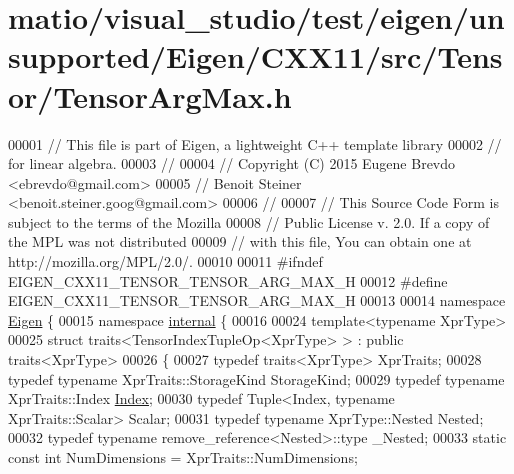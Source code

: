\hypertarget{matio_2visual__studio_2test_2eigen_2unsupported_2_eigen_2_c_x_x11_2src_2_tensor_2_tensor_arg_max_8h_source}{}\section{matio/visual\+\_\+studio/test/eigen/unsupported/\+Eigen/\+C\+X\+X11/src/\+Tensor/\+Tensor\+Arg\+Max.h}
\label{matio_2visual__studio_2test_2eigen_2unsupported_2_eigen_2_c_x_x11_2src_2_tensor_2_tensor_arg_max_8h_source}

\begin{DoxyCode}
00001 \textcolor{comment}{// This file is part of Eigen, a lightweight C++ template library}
00002 \textcolor{comment}{// for linear algebra.}
00003 \textcolor{comment}{//}
00004 \textcolor{comment}{// Copyright (C) 2015 Eugene Brevdo <ebrevdo@gmail.com>}
00005 \textcolor{comment}{//                    Benoit Steiner <benoit.steiner.goog@gmail.com>}
00006 \textcolor{comment}{//}
00007 \textcolor{comment}{// This Source Code Form is subject to the terms of the Mozilla}
00008 \textcolor{comment}{// Public License v. 2.0. If a copy of the MPL was not distributed}
00009 \textcolor{comment}{// with this file, You can obtain one at http://mozilla.org/MPL/2.0/.}
00010 
00011 \textcolor{preprocessor}{#ifndef EIGEN\_CXX11\_TENSOR\_TENSOR\_ARG\_MAX\_H}
00012 \textcolor{preprocessor}{#define EIGEN\_CXX11\_TENSOR\_TENSOR\_ARG\_MAX\_H}
00013 
00014 \textcolor{keyword}{namespace }\hyperlink{namespace_eigen}{Eigen} \{
00015 \textcolor{keyword}{namespace }\hyperlink{namespaceinternal}{internal} \{
00016 
00024 \textcolor{keyword}{template}<\textcolor{keyword}{typename} XprType>
00025 \textcolor{keyword}{struct }traits<TensorIndexTupleOp<XprType> > : \textcolor{keyword}{public} traits<XprType>
00026 \{
00027   \textcolor{keyword}{typedef} traits<XprType> XprTraits;
00028   \textcolor{keyword}{typedef} \textcolor{keyword}{typename} XprTraits::StorageKind StorageKind;
00029   \textcolor{keyword}{typedef} \textcolor{keyword}{typename} XprTraits::Index \hyperlink{namespace_eigen_a62e77e0933482dafde8fe197d9a2cfde}{Index};
00030   \textcolor{keyword}{typedef} Tuple<Index, typename XprTraits::Scalar> Scalar;
00031   \textcolor{keyword}{typedef} \textcolor{keyword}{typename} XprType::Nested Nested;
00032   \textcolor{keyword}{typedef} \textcolor{keyword}{typename} remove\_reference<Nested>::type \_Nested;
00033   \textcolor{keyword}{static} \textcolor{keyword}{const} \textcolor{keywordtype}{int} NumDimensions = XprTraits::NumDimensions;

\end{DoxyCode}
